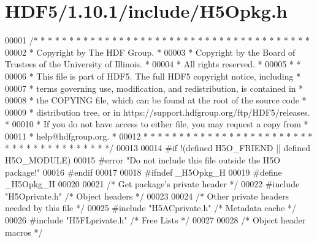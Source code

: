 \hypertarget{_h_d_f5_21_810_81_2include_2_h5_opkg_8h_source}{}\section{H\+D\+F5/1.10.1/include/\+H5\+Opkg.h}
\label{_h_d_f5_21_810_81_2include_2_h5_opkg_8h_source}

\begin{DoxyCode}
00001 \textcolor{comment}{/* * * * * * * * * * * * * * * * * * * * * * * * * * * * * * * * * * * * * * *}
00002 \textcolor{comment}{ * Copyright by The HDF Group.                                               *}
00003 \textcolor{comment}{ * Copyright by the Board of Trustees of the University of Illinois.         *}
00004 \textcolor{comment}{ * All rights reserved.                                                      *}
00005 \textcolor{comment}{ *                                                                           *}
00006 \textcolor{comment}{ * This file is part of HDF5.  The full HDF5 copyright notice, including     *}
00007 \textcolor{comment}{ * terms governing use, modification, and redistribution, is contained in    *}
00008 \textcolor{comment}{ * the COPYING file, which can be found at the root of the source code       *}
00009 \textcolor{comment}{ * distribution tree, or in https://support.hdfgroup.org/ftp/HDF5/releases.  *}
00010 \textcolor{comment}{ * If you do not have access to either file, you may request a copy from     *}
00011 \textcolor{comment}{ * help@hdfgroup.org.                                                        *}
00012 \textcolor{comment}{ * * * * * * * * * * * * * * * * * * * * * * * * * * * * * * * * * * * * * * */}
00013 
00014 \textcolor{preprocessor}{#if !(defined H5O\_FRIEND || defined H5O\_MODULE)}
00015 \textcolor{preprocessor}{#error "Do not include this file outside the H5O package!"}
00016 \textcolor{preprocessor}{#endif}
00017 
00018 \textcolor{preprocessor}{#ifndef \_H5Opkg\_H}
00019 \textcolor{preprocessor}{#define \_H5Opkg\_H}
00020 
00021 \textcolor{comment}{/* Get package's private header */}
00022 \textcolor{preprocessor}{#include "H5Oprivate.h"}     \textcolor{comment}{/* Object headers           */}
00023 
00024 \textcolor{comment}{/* Other private headers needed by this file */}
00025 \textcolor{preprocessor}{#include "H5ACprivate.h"}        \textcolor{comment}{/* Metadata cache                       */}
00026 \textcolor{preprocessor}{#include "H5FLprivate.h"}    \textcolor{comment}{/* Free Lists                           */}
00027 
00028 \textcolor{comment}{/* Object header macros */}

\end{DoxyCode}
